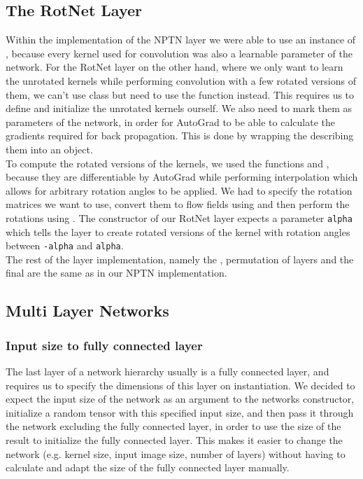 \documentclass{llncs}
\begin{document}
\subsection{The RotNet Layer}
Within the implementation of the NPTN layer we were able to use an instance of \nnConvLayer, because every kernel used for convolution was also a learnable parameter of the network.
For the RotNet layer on the other hand, where we only want to learn the unrotated kernels while performing convolution with a few rotated versions of them, we can't use \nnConvLayer class but need to use the \nnConvFunction  function instead.
This requires us to define and initialize the unrotated kernels ourself. We also need to mark them as parameters of the network, in order for AutoGrad to be able to calculate the gradients required for back propagation. This is done by wrapping the \nnTensor describing them into an \nnParameter object.\\
To compute the rotated versions of the kernels, we used the functions \nnaffinegrid and \nngridsample, because they are differentiable by AutoGrad while performing interpolation which allows for arbitrary rotation angles to be applied. We had to specify the rotation matrices we want to use, convert them to flow fields using \nnaffinegrid and then perform the rotations using \nngridsample. The constructor of our RotNet layer expects a parameter \nolinkurl{alpha} which tells the layer to create rotated versions of the kernel with rotation angles between \nolinkurl{-alpha} and \nolinkurl{alpha}.\\
The rest of the layer implementation, namely the \nnMaxPool, permutation of layers and the final \nnAvgPool are the same as in our NPTN implementation.

\subsection{Multi Layer Networks}


\subsubsection{Input size to fully connected layer}
The last layer of a network hierarchy usually is a fully connected layer, and \pytorch requires us to specify the dimensions of this layer on instantiation. We decided to expect the input size of the network as an argument to the networks constructor, initialize a random tensor with this specified input size, and then pass it through the network excluding the fully connected layer, in order to use the size of the result to initialize the fully connected layer. This makes it easier to change the network (e.g. kernel size, input image size, number of layers) without having to calculate and adapt the size of the fully connected layer manually. 
\end{document}
